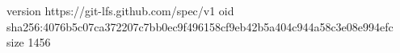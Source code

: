 version https://git-lfs.github.com/spec/v1
oid sha256:4076b5c07ca372207c7bb0ec9f496158cf9eb42b5a404c944a58c3e08e994efc
size 1456
